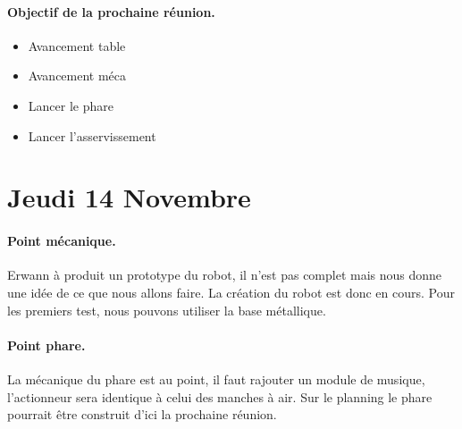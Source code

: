 \documentclass[a4paper,10pt]{report}
\theoremstyle{definition}
\begin{document}
\begin{spacing}{1.5}
\paragraph*{Objectif de la prochaine réunion.}
\begin{itemize}
	\item Avancement table
	\item Avancement méca
	\item Lancer le phare
	\item Lancer l'asservissement
\end{itemize}

\newpage
\section*{Jeudi 14 Novembre}
\paragraph*{Point mécanique.}
Erwann à produit un prototype du robot, il n'est pas complet mais nous donne une idée de ce que nous allons faire. La création du robot est donc en cours.
Pour les premiers test, nous pouvons utiliser la base métallique.

\paragraph*{Point phare.}
La mécanique du phare est au point, il faut rajouter un module de musique, l'actionneur sera identique à celui des manches à air.
Sur le planning le phare pourrait être construit d'ici la prochaine réunion.


\end{spacing}
\end{document}
